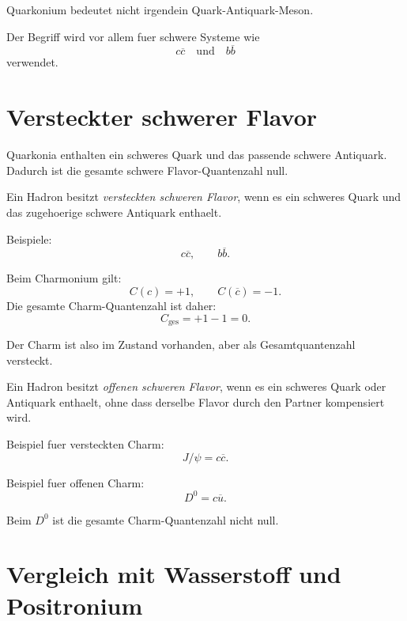 \begin{examtipbox}
Quarkonium bedeutet nicht irgendein Quark-Antiquark-Meson.

Der Begriff wird vor allem fuer schwere Systeme wie
\[
    c\overline{c}
    \quad\text{und}\quad
    b\overline{b}
\]
verwendet.
\end{examtipbox}

\section{Versteckter schwerer Flavor}

Quarkonia enthalten ein schweres Quark und das passende schwere Antiquark.
Dadurch ist die gesamte schwere Flavor-Quantenzahl null.

\begin{definitionbox}
Ein Hadron besitzt \emph{versteckten schweren Flavor}, wenn es ein schweres Quark
und das zugehoerige schwere Antiquark enthaelt.

Beispiele:
\[
    c\overline{c},
    \qquad
    b\overline{b}.
\]
\end{definitionbox}

\begin{conceptbox}
Beim Charmonium gilt:
\[
    C(c)=+1,
    \qquad
    C(\overline{c})=-1.
\]
Die gesamte Charm-Quantenzahl ist daher:
\[
    C_{\mathrm{ges}}=+1-1=0.
\]

Der Charm ist also im Zustand vorhanden, aber als Gesamtquantenzahl versteckt.
\end{conceptbox}

\begin{definitionbox}
Ein Hadron besitzt \emph{offenen schweren Flavor}, wenn es ein schweres Quark oder
Antiquark enthaelt, ohne dass derselbe Flavor durch den Partner kompensiert wird.
\end{definitionbox}

\begin{examplebox}
Beispiel fuer versteckten Charm:
\[
    J/\psi = c\overline{c}.
\]

Beispiel fuer offenen Charm:
\[
    D^0 = c\overline{u}.
\]

Beim $D^0$ ist die gesamte Charm-Quantenzahl nicht null.
\end{examplebox}

\section{Vergleich mit Wasserstoff und Positronium}

